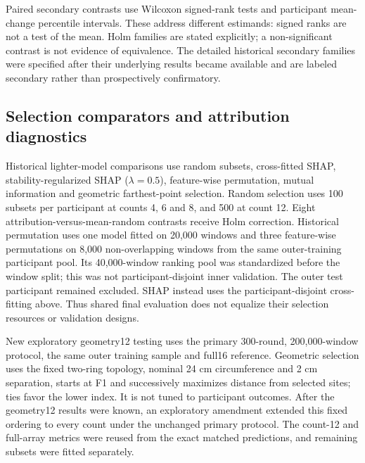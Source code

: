 Paired secondary contrasts use Wilcoxon signed-rank tests and participant mean-change percentile intervals. These address different estimands: signed ranks are not a test of the mean. Holm families are stated explicitly; a non-significant contrast is not evidence of equivalence. The detailed historical secondary families were specified after their underlying results became available and are labeled secondary rather than prospectively confirmatory.

\subsection{Selection comparators and attribution diagnostics}
Historical lighter-model comparisons use random subsets, cross-fitted SHAP, stability-regularized SHAP ($\lambda=0.5$), feature-wise permutation, mutual information and geometric farthest-point selection. Random selection uses 100 subsets per participant at counts 4, 6 and 8, and 500 at count 12. Eight attribution-versus-mean-random contrasts receive Holm correction. Historical permutation uses one model fitted on 20,000 windows and three feature-wise permutations on 8,000 non-overlapping windows from the same outer-training participant pool. Its 40,000-window ranking pool was standardized before the window split; this was not participant-disjoint inner validation. The outer test participant remained excluded. SHAP instead uses the participant-disjoint cross-fitting above. Thus shared final evaluation does not equalize their selection resources or validation designs.

New exploratory geometry12 testing uses the primary 300-round, 200,000-window protocol, the same outer training sample and full16 reference. Geometric selection uses the fixed two-ring topology, nominal 24 cm circumference and 2 cm separation, starts at F1 and successively maximizes distance from selected sites; ties favor the lower index. It is not tuned to participant outcomes. After the geometry12 results were known, an exploratory amendment extended this fixed ordering to every count under the unchanged primary protocol. The count-12 and full-array metrics were reused from the exact matched predictions, and remaining subsets were fitted separately.

